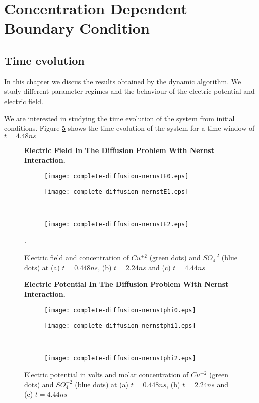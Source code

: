 \section{Concentration Dependent Boundary Condition}
\subsection{Time evolution}

In this chapter we discus the results obtained by the dynamic algorithm. We study different parameter regimes and the behaviour of the electric potential and electric field.

We are interested in studying the time evolution of the system from initial conditions. Figure \ref{fig:ef1} shows the time evolution of the system for a time window of $t = 4.48 ns$




\begin{figure}[htbp]
\centering
\textbf{Electric Field In The Diffusion Problem With Nernst Interaction.}\par\medskip
\begin{subfigure}{.5\linewidth}
\centering
\texttt{[image: complete-diffusion-nernstE0.eps]}
\caption{}
\label{fig:ef1}
\end{subfigure}%
\begin{subfigure}{.5\linewidth}
\centering
\texttt{[image: complete-diffusion-nernstE1.eps]}
\caption{}
\label{fig:ef2}
\end{subfigure}\\[1ex]
\begin{subfigure}{\linewidth}
\centering
\texttt{[image: complete-diffusion-nernstE2.eps]}
\caption{}
\label{fig:ef3}
\end{subfigure}
\caption{Electric field and concentration of $Cu^{+2}$ (green dots) and $SO_4^{-2}$ (blue dots) at (a) $t = 0.448 ns$, (b) $t = 2.24 ns$ and (c) $t = 4.44 ns$}.
\label{fig:test}
\end{figure}

\begin{figure}[htbp]
\centering
\textbf{Electric Potential In The Diffusion Problem With Nernst Interaction.}\par\medskip
\begin{subfigure}{.5\linewidth}
\centering
\texttt{[image: complete-diffusion-nernstphi0.eps]}
\caption{}
\label{fig:ef1}
\end{subfigure}%
\begin{subfigure}{.5\linewidth}
\centering
\texttt{[image: complete-diffusion-nernstphi1.eps]}
\caption{}
\label{fig:ef2}
\end{subfigure}\\[1ex]
\begin{subfigure}{\linewidth}
\centering
\texttt{[image: complete-diffusion-nernstphi2.eps]}
\caption{}
\label{fig:ef3}
\end{subfigure}
\caption{Electric potential in volts and molar concentration of $Cu^{+2}$ (green dots) and $SO_4^{-2}$ (blue dots) at (a) $t = 0.448 ns$, (b) $t = 2.24 ns$ and (c) $t = 4.44 ns$}
\label{fig:test}
\end{figure}


